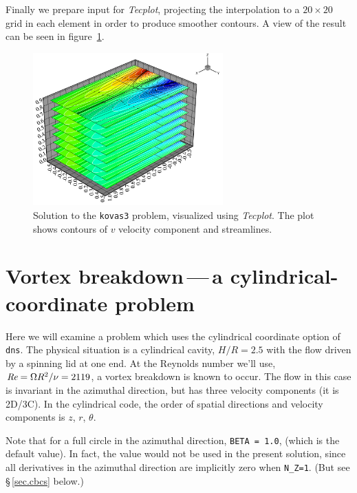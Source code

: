 \documentclass[11pt]{report}
\def\Rey{\mbox{\it Re}}                             %
\begin{document}
Finally we prepare input for \emph{Tecplot}, projecting the
interpolation to a $20\times20$ grid in each element in order to
produce smoother contours.  A view of the result can be seen in
figure~\ref{kov3soln}.
\begin{figure}
\begin{center}
\includegraphics[width=0.65\textwidth]{kovas3_bitmap}
\end{center}
\caption{
\label{kov3soln}
  Solution to the \texttt{kovas3} problem, visualized using
  \emph{Tecplot}.  The plot shows contours of $v$ velocity component
  and streamlines.  }
\end{figure}

\section{Vortex breakdown\,---\,a cylindrical-coordinate problem}
\label{sec.vb}

Here we will examine a problem which uses the cylindrical coordinate
option of \verb+dns+.  The physical situation is a cylindrical cavity,
$H/R=2.5$ with the flow driven by a spinning lid at one end.  At the
Reynolds number we'll use, $\Rey=\Omega R^2/\nu=2119$, a vortex
breakdown is known to occur.  The flow in this case is invariant in
the azimuthal direction, but has three velocity components (it is
2D/3C).  In the cylindrical code, the order of spatial directions and
velocity components is $z$, $r$, $\theta$.

Note that for a full circle in the azimuthal direction, \texttt{BETA =
  1.0}, (which is the default value). In fact, the value would not be
used in the present solution, since all derivatives in the azimuthal
direction are implicitly zero when \verb+N_Z=1+. (But see
\S\,\ref{sec.cbcs} below.)
\end{document}
